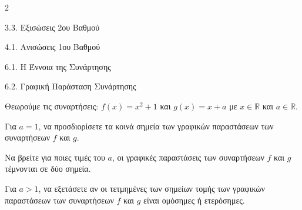 \begin{ylh}{2}
    \item 3.3. Εξισώσεις 2ου Βαθμού
    \item 4.1. Ανισώσεις 1ου Βαθμού
    \item 6.1. Η Έννοια της Συνάρτησης
    \item 6.2. Γραφική Παράσταση Συνάρτησης
\end{ylh}
Θεωρούμε τις συναρτήσεις:
$f(x) = x^{2} + 1$ και $g(x) = x + a$ με $x\mathbb{\in R}$ και $a\mathbb{\in R}$.
\begin{alist}
\item Για $a = 1$, να προσδιορίσετε τα κοινά σημεία των γραφικών παραστάσεων των συναρτήσεων $f$ και $g$.
\item Να βρείτε για ποιες τιμές του $a$, οι γραφικές παραστάσεις των συναρτήσεων $f$ και $g$ τέμνονται σε δύο σημεία.
\item Για $a > 1$, να εξετάσετε αν οι τετμημένες των σημείων τομής των γραφικών παραστάσεων των συναρτήσεων $f$ και $g$ είναι ομόσημες ή ετερόσημες.
\end{alist}

